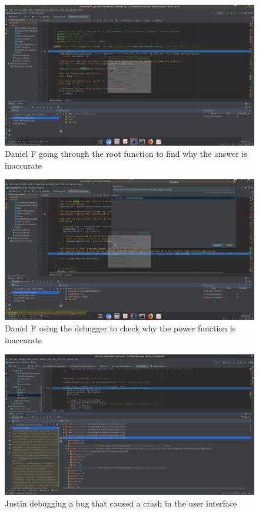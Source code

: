\documentclass[a4paper, 12pt]{article}
\begin{document}
\vspace{20mm}
\begin{figure}[H]
\centering
\includegraphics[width=1.13\textwidth]{Dany2.png}
\caption{Daniel F going through the root function to find why the answer is inaccurate }
\label{Dany2}
\end{figure}

\vspace{20mm}
\begin{figure}[H]
\centering
\includegraphics[width=1.13\textwidth]{Dany3.png}
\caption{Daniel F using the debugger to check why the power function is inaccurate}
\label{Dany3}
\end{figure}

\vspace{20mm}
\begin{figure}[H]
\centering
\includegraphics[width=1.13\textwidth]{justin.jpg}
\caption{Justin debugging a bug that caused a crash in the user interface}
\label{Justin}
\end{figure}
\end{document}
